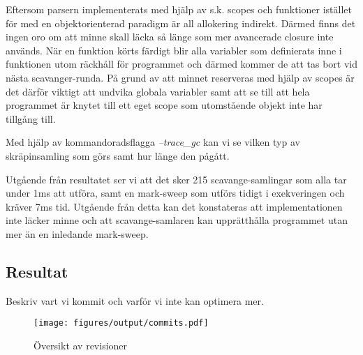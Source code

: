 Eftersom parsern implementerats med hjälp av s.k. scopes och funktioner istället
för med en objektorienterad paradigm är all allokering indirekt. Därmed finns
det ingen oro om att minne skall läcka så länge som mer avancerade closure
inte används. När en funktion körts färdigt blir alla variabler som
definierats inne i funktionen utom räckhåll för programmet och därmed kommer
de att tas bort vid nästa scavanger-runda. På grund av att minnet reserveras
med hjälp av scopes är det därför viktigt att undvika globala variabler
samt att se till att hela programmet är knytet till ett eget scope som utomstående
objekt inte har tillgång till.

Med hjälp av kommandoradsflagga \textit{--trace_gc} kan vi se vilken typ av
skräpinsamling som görs samt hur länge den pågått.

Utgående från resultatet ser vi att det sker 215 scavange-samlingar som alla
tar under 1ms att utföra, samt en mark-sweep som utförs tidigt i exekveringen
och kräver 7ms tid. Utgående från detta kan det konstateras att
implementationen inte läcker minne och att scavange-samlaren kan upprätthålla
programmet utan mer än en inledande mark-sweep.


\subsection{Resultat}

Beskriv vart vi kommit och varför vi inte kan optimera mer.

\begin{figure}[ht]
  \texttt{[image: figures/output/commits.pdf]}
  \caption{Översikt av revisioner}
\end{figure}

